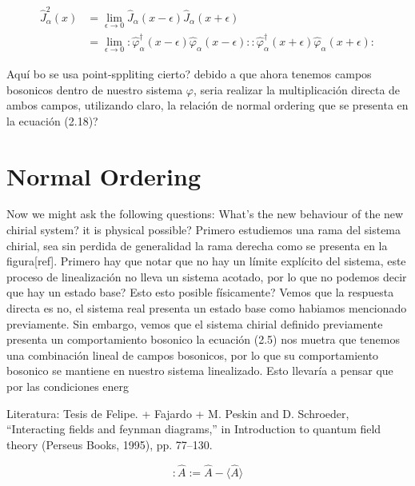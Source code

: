 \begin{itemize}
   \begin{align}
\hat{J}_{\alpha}^{2}(x) & =\lim _{\epsilon \rightarrow 0} \hat{J}_{\alpha}(x-\epsilon) \hat{J}_{\alpha}(x+\epsilon)  \\
& =\lim _{\epsilon \rightarrow 0}: \hat{\varphi}_{\alpha}^{\dagger}(x-\epsilon) \hat{\varphi}_{\alpha}(x-\epsilon):: \hat{\varphi}_{\alpha}^{\dagger}(x+\epsilon) \hat{\varphi}_{\alpha}(x+\epsilon):
\end{align} 

Aquí bo se usa point-sppliting cierto? debido a que ahora tenemos campos bosonicos dentro de nuestro sistema $\varphi$, seria realizar la multiplicación directa de ambos campos, utilizando claro, la relación de normal ordering que se presenta en la ecuación (2.18)?
\end{itemize}





\section{Normal Ordering}
    Now we might ask the following questions: What's the new behaviour of the new chirial system? it is physical possible? Primero estudiemos una rama del sistema chirial, sea sin perdida de generalidad la rama derecha como se presenta en la figura[ref]. Primero hay que notar que no hay un límite explícito del sistema, este proceso de linealización no lleva un sistema acotado, por lo que no podemos decir que hay un estado base? Esto esto posible físicamente? Vemos que la respuesta directa es no, el sistema real presenta un estado base como habiamos mencionado previamente. Sin embargo, vemos que el sistema chirial definido previamente presenta un comportamiento bosonico la ecuación (2.5) nos muetra que tenemos una combinación lineal de campos bosonicos, por lo que su comportamiento bosonico se mantiene en nuestro sistema linealizado. Esto llevaría a pensar que por las condiciones energ





    Literatura: Tesis de Felipe. + Fajardo + M. Peskin and D. Schroeder, “Interacting ﬁelds and feynman diagrams,” in Introduction to quantum ﬁeld theory (Perseus Books, 1995), pp. 77–130.

\begin{equation}
: \hat{A}:=\hat{A}-\langle\hat{A}\rangle 
\end{equation}



